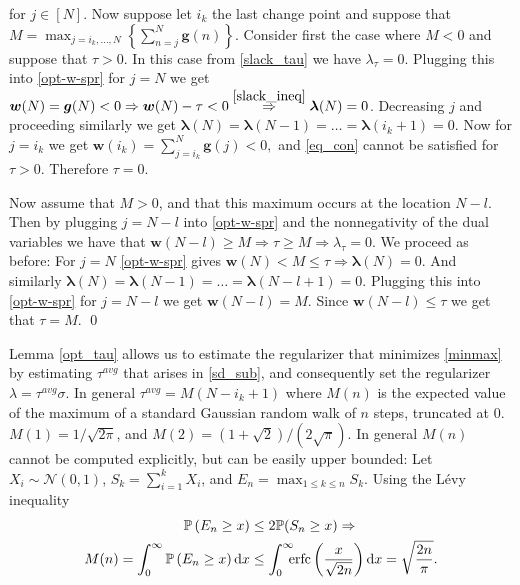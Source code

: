 \documentclass[11pt]{article}
\begin{document}
for $j\in [N]$. Now suppose let $i_k$ the last change point and suppose that 
$M = \max_{j=i_k,\ldots,N}\left\{ \sum_{n=j}^{N}\bm{g}(n)\right\}.$
Consider first the case where $M<0$ and suppose that $\tau > 0$. In this case from \eqref{slack_tau} we have $\lambda_{\tau} = 0$. Plugging this into \eqref{opt-w-spr} for $j=N$ we get $\bm{w}(N) = \bm{g}(N) < 0 \Rightarrow \bm{w}(N) - \tau < 0 \stackrel{\eqref{slack_ineq}}{\Rightarrow} \bm{\lambda}(N) = 0$. Decreasing $j$ and proceeding similarly we get $\bm{\lambda}(N) = \bm{\lambda}(N-1) = \ldots = \bm{\lambda}(i_k+1) = 0$. Now for $j=i_k$ we get
$
	\bm{w}(i_k) = \sum_{j=i_k}^N\bm{g}(j) < 0,
$
and \eqref{eq_con} cannot be satisfied for $\tau > 0$. Therefore $\tau = 0$. 

Now assume that $M>0$, and that this maximum occurs at the location $N-l$. %
Then by plugging $j=N-l$ into \eqref{opt-w-spr} and the nonnegativity of the dual variables we have that $\bm{w}(N-l) \geq M \Rightarrow \tau \geq M \Rightarrow \lambda_{\tau} = 0$. We proceed as before: For $j=N$ \eqref{opt-w-spr} gives $\bm{w}(N) < M \leq \tau \Rightarrow \bm{\lambda}(N) = 0$. And similarly $\bm{\lambda}(N) = \bm{\lambda}(N-1) = \ldots = \bm{\lambda}(N-l+1) = 0$. Plugging this into \eqref{opt-w-spr} for $j=N-l$ we get $\bm{w}(N-l) = M$. Since $\bm{w}(N-l) \leq \tau$ we get that $\tau = M$. \qed

\noindent Lemma \ref{opt_tau} allows us to estimate the regularizer that minimizes \eqref{minmax} by estimating $\tau^{avg}$ that arises in \eqref{sd_sub}, and consequently set the regularizer $\lambda = \tau^{avg}\sigma$. In general $\tau^{avg} = M(N-i_k+1)$ where $M(n)$ is the expected value of the maximum of a standard Gaussian random walk of $n$ steps, truncated at 0. $M(1) = 1/\sqrt{2\pi}$, and $M(2) = (1+\sqrt{2})/(2\sqrt{\pi})$. In general $M(n)$ cannot be computed explicitly, 
but can be easily upper bounded:
Let $X_i\sim \mathcal{N}(0,1)$, $S_k = \sum_{i=1}^kX_i$, and $E_n = \max_{1\leq k \leq n}S_k$.  Using the L\'{e}vy inequality
\[ \begin{split}
	\mathbb{P}\left(E_n \geq x\right) &\leq 2\mathbb{P}(S_n \geq x) \Rightarrow  \\
	M(n)  = \int_{0}^{\infty}\mathbb{P}\left(E_n \geq x\right) \mathrm{d} x 
		 & \leq \int_{0}^{\infty}\hskip-0.2cm\mathrm{erfc}\left(\frac{x}{\sqrt{2n}}\right) \mathrm{d}x = \sqrt{\frac{2n}{\pi}}.
\end{split} \]
\end{document}
